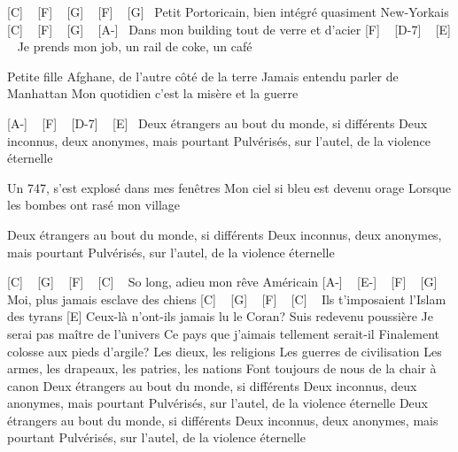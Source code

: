 

[C] ~ [F] ~ [G] ~ [F] ~ [G]~
Petit Portoricain, bien intégré quasiment New-Yorkais
[C] ~ [F] ~ [G] ~ [A-]~
Dans mon building tout de verre et d'acier
[F] ~ [D-7] ~ [E] ~
Je prends mon job, un rail de coke, un café

Petite fille Afghane, de l'autre côté de la terre
Jamais entendu parler de Manhattan
Mon quotidien c'est la misère et la guerre

[A-] ~ [F] ~ [D-7] ~ [E]~
Deux étrangers au bout du monde, si différents
Deux inconnus, deux anonymes, mais pourtant
Pulvérisés, sur l'autel, de la violence éternelle

Un 747, s'est explosé dans mes fenêtres
Mon ciel si bleu est devenu orage
Lorsque les bombes ont rasé mon village

Deux étrangers au bout du monde, si différents
Deux inconnus, deux anonymes, mais pourtant
Pulvérisés, sur l'autel, de la violence éternelle

[C] ~ [G] ~ [F] ~ [C] ~
So long, adieu mon rêve Américain
[A-] ~ [E-] ~ [F] ~ [G]~
Moi, plus jamais esclave des chiens
[C] ~ [G] ~ [F] ~ [C] ~
Ils t'imposaient l'Islam des tyrans
[E]
Ceux-là n'ont-ils jamais lu le Coran?
Suis redevenu poussière
Je serai pas maître de l'univers
Ce pays que j'aimais tellement serait-il
Finalement colosse aux pieds d'argile?
Les dieux, les religions
Les guerres de civilisation
Les armes, les drapeaux, les patries, les nations
Font toujours de nous de la chair à canon
Deux étrangers au bout du monde, si différents
Deux inconnus, deux anonymes, mais pourtant
Pulvérisés, sur l'autel, de la violence éternelle
Deux étrangers au bout du monde, si différents
Deux inconnus, deux anonymes, mais pourtant
Pulvérisés, sur l'autel, de la violence éternelle